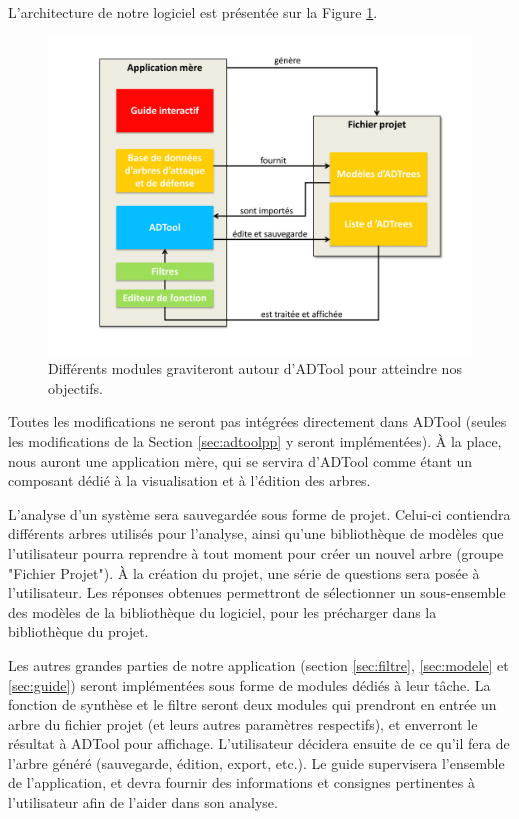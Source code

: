         L'architecture de notre logiciel est présentée sur la Figure \ref{fig:archi}.   

        \begin{figure}
            \begin{center}
                \includegraphics[width=1\textwidth]{figure/archi.pdf}
            \end{center}
            \caption{Différents modules graviteront autour d'ADTool pour atteindre nos objectifs.}
            \label{fig:archi}
        \end{figure}

        Toutes les modifications ne seront pas intégrées directement dans ADTool (seules les modifications de la Section \ref{sec:adtoolpp} y seront implémentées). \`A la place, nous auront une application mère, qui se servira d'ADTool comme étant un composant dédié à la visualisation et à l'édition des arbres. 

        L'analyse d'un système sera sauvegardée sous forme de projet. Celui-ci contiendra différents arbres utilisés pour l'analyse, ainsi qu'une bibliothèque de modèles que l'utilisateur pourra reprendre à tout moment pour créer un nouvel arbre (groupe "Fichier Projet"). 
        \`A la création du projet, une série de questions sera posée à l'utilisateur. Les réponses obtenues permettront de sélectionner un sous-ensemble des modèles de la bibliothèque du logiciel, pour les précharger dans la bibliothèque du projet.

        Les autres grandes parties de notre application (section \ref{sec:filtre}, \ref{sec:modele} et \ref{sec:guide}) seront implémentées sous forme de modules dédiés à leur tâche.
        La fonction de synthèse et le filtre seront deux modules qui prendront en entrée un arbre du fichier projet (et leurs autres paramètres respectifs), et enverront le résultat à ADTool pour affichage. L'utilisateur décidera ensuite de ce qu'il fera de l'arbre généré (sauvegarde, édition, export, etc.).
        Le guide supervisera l'ensemble de l'application, et devra fournir des informations et consignes pertinentes à l'utilisateur afin de l'aider dans son analyse.


